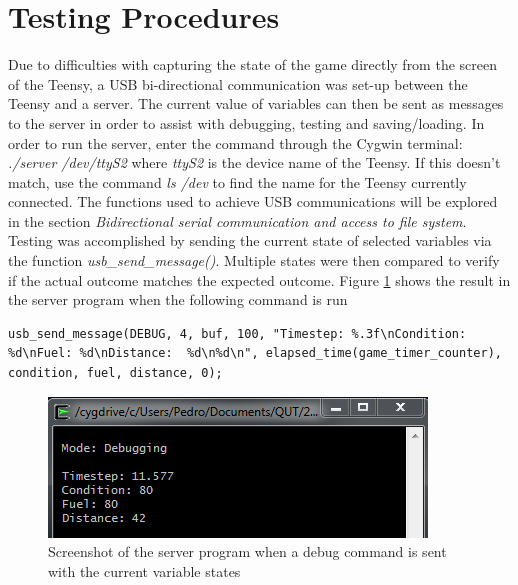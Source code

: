 \documentclass{article}
\begin{document}
\section{Testing Procedures}
Due to difficulties with capturing the state of the game directly from the screen of the Teensy, a USB bi-directional communication was set-up between the Teensy and a server. The current value of variables can then be sent as messages to the server in order to assist with debugging, testing and saving/loading. 
\newline
\newline
In order to run the server, enter the command through the Cygwin terminal: \emph{./server /dev/ttyS2} where \emph{ttyS2} is the device name of the Teensy. If this doesn't match, use the command \emph{ls /dev} to find the name for the Teensy currently connected. 
\newline
\newline
The functions used to achieve USB communications will be explored in the section \emph{Bidirectional serial communication and access to file system}. 
\newline
\newline
Testing was accomplished by sending the current state of selected variables via the function \emph{usb\_send\_message()}. Multiple states were then compared to verify if the actual outcome matches the expected outcome.
\newline
\newline
Figure \ref{test_debug} shows the result in the server program when the following command is run
\begin{lstlisting}[style=CStyle]
	usb_send_message(DEBUG, 4, buf, 100, "Timestep: %.3f\nCondition: %d\nFuel: %d\nDistance:  %d\n%d\n", elapsed_time(game_timer_counter), condition, fuel, distance, 0);
\end{lstlisting}
\begin{figure}[!ht]
	\begin{center}
	\includegraphics[width=0.8\paperwidth]{images/testing_debug}
	\caption{Screenshot of the server program when a debug command is sent with the current variable states}
	\label{test_debug} 
	\end{center}
\end{figure}
\end{document}
